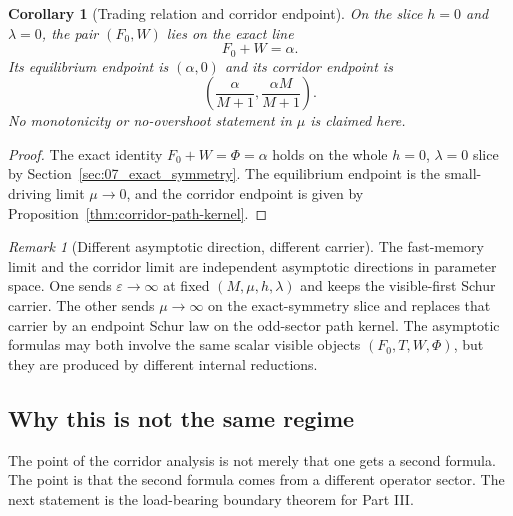\documentclass[11pt]{article}
\numberwithin{equation}{section}
\newcommand{\eps}{\varepsilon}
\theoremstyle{thmcompact}
\newtheorem{corollary}[theorem]{Corollary}
\theoremstyle{remark}
\newtheorem*{remarkplain}{Remark}
\newenvironment{remark}[1][]%
{\begin{remarkbox}\begin{remarkplain}[#1]\normalfont}
		{\end{remarkplain}\end{remarkbox}}
\begin{document}
\begin{corollary}[Trading relation and corridor endpoint]\label{cor:corridor-trading-endpoint}
On the slice $h=0$ and $\lambda=0$, the pair $(F_0,W)$ lies on the exact line
\begin{equation}\label{eq:corridor-trading-segment}
F_0+W=\alpha.
\end{equation}
Its equilibrium endpoint is $(\alpha,0)$ and its corridor endpoint is
\begin{equation}\label{eq:corridor-endpoint-pair}
\left(\frac{\alpha}{M+1},\frac{\alpha M}{M+1}\right).
\end{equation}
No monotonicity or no-overshoot statement in $\mu$ is claimed here.
\end{corollary}

\begin{proof}
The exact identity $F_0+W=\Phi=\alpha$ holds on the whole $h=0$, $\lambda=0$ slice by Section~\ref{sec:07_exact_symmetry}. The equilibrium endpoint is the small-driving limit $\mu\to 0$, and the corridor endpoint is given by Proposition~\ref{thm:corridor-path-kernel}.
\end{proof}

\begin{remark}[Different asymptotic direction, different carrier]
The fast-memory limit and the corridor limit are independent asymptotic directions in parameter space. One sends $\eps\to\infty$ at fixed $(M,\mu,h,\lambda)$ and keeps the visible-first Schur carrier. The other sends $\mu\to\infty$ on the exact-symmetry slice and replaces that carrier by an endpoint Schur law on the odd-sector path kernel. The asymptotic formulas may both involve the same scalar visible objects $(F_0,T,W,\Phi)$, but they are produced by different internal reductions.
\end{remark}

\subsection{Why this is not the same regime}
\label{subsec:not-the-same-regime}

The point of the corridor analysis is not merely that one gets a second formula. The point is that the second formula comes from a different operator sector. The next statement is the load-bearing boundary theorem for Part III.
\end{document}
